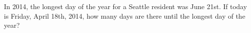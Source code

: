 In 2014, the longest day of the year for a Seattle resident was June 21st. If today is Friday, April 18th, 2014, how many days are there until the longest day of the year?
